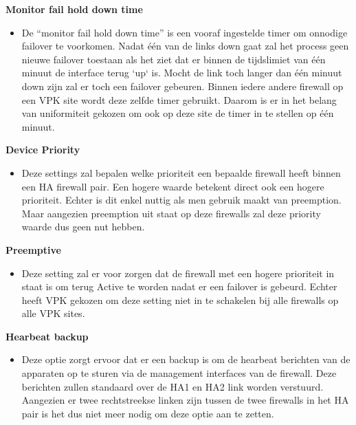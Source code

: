 \textbf{Monitor fail hold down time}
\begin{itemize}[label=\textbullet]
    \item De ``monitor fail hold down time'' is een vooraf ingestelde timer om onnodige failover te voorkomen. Nadat één van de links down gaat zal het process geen nieuwe failover toestaan als het ziet dat er binnen de tijdslimiet van één minuut de interface terug `up` is. Mocht de link toch langer dan één minuut down zijn zal er toch een failover gebeuren. Binnen iedere andere firewall op een VPK site wordt deze zelfde timer gebruikt. Daarom is er in het belang van uniformiteit gekozen om ook op deze site de timer in te stellen op één minuut.
\end{itemize}



\textbf{Device Priority}
\begin{itemize}[label=\textbullet]
    \item Deze settings zal bepalen welke prioriteit een bepaalde firewall heeft binnen een HA firewall pair. Een hogere waarde betekent direct ook een hogere prioriteit. Echter is dit enkel nuttig als men gebruik maakt van preemption. Maar aangezien preemption uit staat op deze firewalls zal deze priority waarde dus geen nut hebben.
\end{itemize}



\textbf{Preemptive}
\begin{itemize}[label=\textbullet]
    \item Deze setting zal er voor zorgen dat de firewall met een hogere prioriteit in staat is om terug Active te worden nadat er een failover is gebeurd. Echter heeft VPK gekozen om deze setting niet in te schakelen bij alle firewalls op alle VPK sites.
\end{itemize}



\textbf{Hearbeat backup}
\begin{itemize}[label=\textbullet]
    \item Deze optie zorgt ervoor dat er een backup is om de hearbeat berichten van de apparaten op te sturen via de management interfaces van de firewall. Deze berichten zullen standaard over de HA1 en HA2 link worden verstuurd. Aangezien er twee rechtstreekse linken zijn tussen de twee firewalls in het HA pair is het dus niet meer nodig om deze optie aan te zetten.
\end{itemize}



